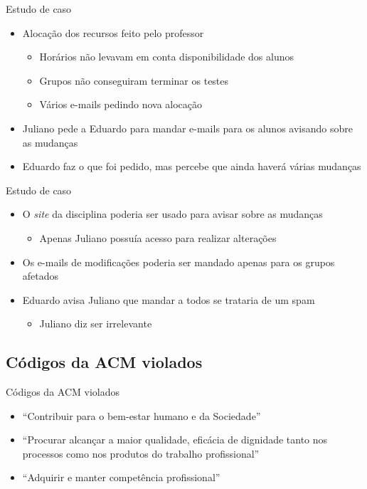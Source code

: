 \documentclass[dvipdfm]{beamer}
\begin{document}
\begin{frame}{Estudo de caso}
	\begin{itemize}
		\item Alocação dos recursos feito pelo professor
		\begin{itemize}
			\item Horários não levavam em conta disponibilidade dos alunos
			\item Grupos não conseguiram terminar os testes
			\item Vários e-mails pedindo nova alocação
		\end{itemize}
		\item Juliano pede a Eduardo para mandar e-mails para os alunos avisando sobre as mudanças
		\item Eduardo faz o que foi pedido, mas percebe que ainda haverá várias mudanças
	\end{itemize}
\end{frame}

\begin{frame}{Estudo de caso}
\begin{itemize}
	\item O \emph{site} da disciplina poderia ser usado para avisar sobre as mudanças
	\begin{itemize}
		\item Apenas Juliano possuía acesso para realizar alterações
	\end{itemize}
	\item Os e-mails de modificações poderia ser mandado apenas para os grupos afetados
	\item Eduardo avisa Juliano que mandar a todos se trataria de um spam
	\begin{itemize}
		\item Juliano diz ser irrelevante
	\end{itemize}
\end{itemize}
\end{frame}

\subsection{Códigos da ACM violados}
\begin{frame}{Códigos da ACM violados}
		\begin{itemize}
			\item ``Contribuir para o bem-estar humano e da Sociedade''\\
				
			\item ``Procurar alcançar a maior qualidade, eficácia de dignidade tanto nos processos como nos produtos do trabalho profissional''\\
				
			\item ``Adquirir e manter competência profissional''\\
				
		\end{itemize}
\end{frame}
\end{document}
